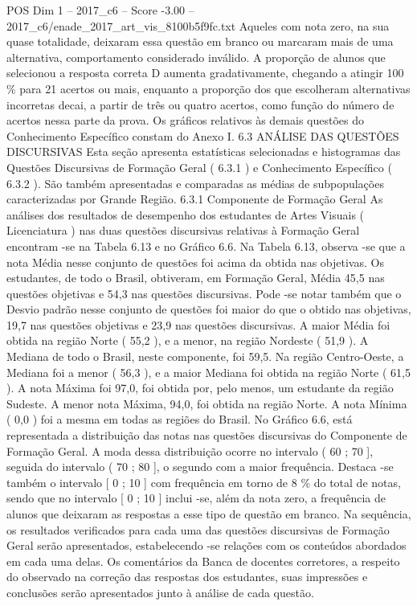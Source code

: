 \begin{textsample}{POS Dim 1 – 2017\_c6 – Score -3.00 – 2017\_c6/enade\_2017\_art\_vis\_8100b5f9fc.txt}
Aqueles com nota zero, na sua quase totalidade, deixaram essa questão em branco ou marcaram mais de uma alternativa, comportamento considerado inválido.
A proporção de alunos que selecionou a resposta correta D aumenta gradativamente, chegando a atingir 100 \% para 21 acertos ou mais, enquanto a proporção dos que escolheram alternativas incorretas decai, a partir de três ou quatro acertos, como função do número de acertos nessa parte da prova.
Os gráficos relativos às demais questões do Conhecimento Específico constam do Anexo I. 6.3 ANÁLISE DAS QUESTÕES DISCURSIVAS Esta seção apresenta estatísticas selecionadas e histogramas das Questões Discursivas de Formação Geral ( 6.3.1 ) e Conhecimento Específico ( 6.3.2 ).
São também apresentadas e comparadas as médias de subpopulações caracterizadas por Grande Região. 6.3.1 Componente de Formação Geral As análises dos resultados de desempenho dos estudantes de Artes Visuais ( Licenciatura ) nas duas questões discursivas relativas à Formação Geral encontram -se na Tabela 6.13 e no Gráfico 6.6.
Na Tabela 6.13, observa -se que a nota Média nesse conjunto de questões foi acima da obtida nas objetivas.
Os estudantes, de todo o Brasil, obtiveram, em Formação Geral, Média 45,5 nas questões objetivas e 54,3 nas questões discursivas.
Pode -se notar também que o Desvio padrão nesse conjunto de questões foi maior do que o obtido nas objetivas, 19,7 nas questões objetivas e 23,9 nas questões discursivas.
A maior Média foi obtida na região Norte ( 55,2 ), e a menor, na região Nordeste ( 51,9 ).
A Mediana de todo o Brasil, neste componente, foi 59,5.
Na região Centro-Oeste, a Mediana foi a menor ( 56,3 ), e a maior Mediana foi obtida na região Norte ( 61,5 ).
A nota Máxima foi 97,0, foi obtida por, pelo menos, um estudante da região Sudeste.
A menor nota Máxima, 94,0, foi obtida na região Norte.
A nota Mínima ( 0,0 ) foi a mesma em todas as regiões do Brasil.
No Gráfico 6.6, está representada a distribuição das notas nas questões discursivas do Componente de Formação Geral.
A moda dessa distribuição ocorre no intervalo ( 60 ; 70 ], seguida do intervalo ( 70 ; 80 ], o segundo com a maior frequência.
Destaca -se também o intervalo [ 0 ; 10 ] com frequência em torno de 8 \% do total de notas, sendo que no intervalo [ 0 ; 10 ] inclui -se, além da nota zero, a frequência de alunos que deixaram as respostas a esse tipo de questão em branco.
Na sequência, os resultados verificados para cada uma das questões discursivas de Formação Geral serão apresentados, estabelecendo -se relações com os conteúdos abordados em cada uma delas.
Os comentários da Banca de docentes corretores, a respeito do observado na correção das respostas dos estudantes, suas impressões e conclusões serão apresentados junto à análise de cada questão.

\end{textsample}
